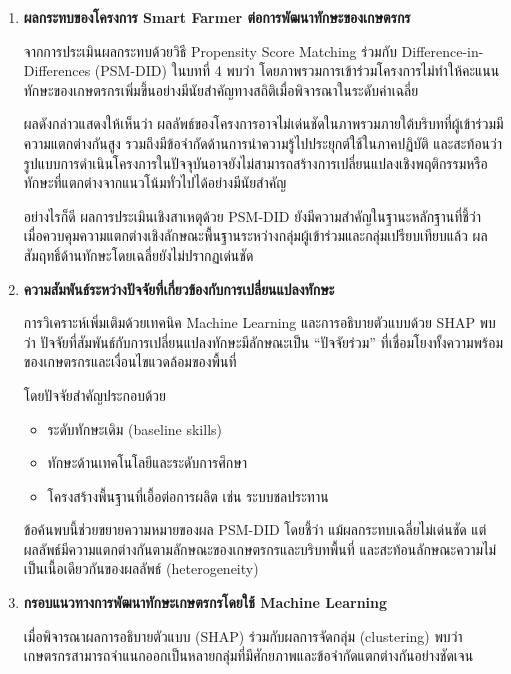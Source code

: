 \begin{enumerate}

\item \textbf{ผลกระทบของโครงการ Smart Farmer ต่อการพัฒนาทักษะของเกษตรกร}

จากการประเมินผลกระทบด้วยวิธี Propensity Score Matching ร่วมกับ Difference-in-Differences (PSM-DID) ในบทที่ 4 พบว่า โดยภาพรวมการเข้าร่วมโครงการไม่ทำให้คะแนนทักษะของเกษตรกรเพิ่มขึ้นอย่างมีนัยสำคัญทางสถิติเมื่อพิจารณาในระดับค่าเฉลี่ย

ผลดังกล่าวแสดงให้เห็นว่า ผลลัพธ์ของโครงการอาจไม่เด่นชัดในภาพรวมภายใต้บริบทที่ผู้เข้าร่วมมีความแตกต่างกันสูง รวมถึงมีข้อจำกัดด้านการนำความรู้ไปประยุกต์ใช้ในภาคปฏิบัติ และสะท้อนว่า รูปแบบการดำเนินโครงการในปัจจุบันอาจยังไม่สามารถสร้างการเปลี่ยนแปลงเชิงพฤติกรรมหรือทักษะที่แตกต่างจากแนวโน้มทั่วไปได้อย่างมีนัยสำคัญ

อย่างไรก็ดี ผลการประเมินเชิงสาเหตุด้วย PSM-DID ยังมีความสำคัญในฐานะหลักฐานที่ชี้ว่า เมื่อควบคุมความแตกต่างเชิงลักษณะพื้นฐานระหว่างกลุ่มผู้เข้าร่วมและกลุ่มเปรียบเทียบแล้ว ผลสัมฤทธิ์ด้านทักษะโดยเฉลี่ยยังไม่ปรากฏเด่นชัด

\item \textbf{ความสัมพันธ์ระหว่างปัจจัยที่เกี่ยวข้องกับการเปลี่ยนแปลงทักษะ}

การวิเคราะห์เพิ่มเติมด้วยเทคนิค Machine Learning และการอธิบายตัวแบบด้วย SHAP พบว่า ปัจจัยที่สัมพันธ์กับการเปลี่ยนแปลงทักษะมีลักษณะเป็น “ปัจจัยร่วม” ที่เชื่อมโยงทั้งความพร้อมของเกษตรกรและเงื่อนไขแวดล้อมของพื้นที่

โดยปัจจัยสำคัญประกอบด้วย

\begin{itemize}
\item ระดับทักษะเดิม (baseline skills)
\item ทักษะด้านเทคโนโลยีและระดับการศึกษา
\item โครงสร้างพื้นฐานที่เอื้อต่อการผลิต เช่น ระบบชลประทาน
\end{itemize}

ข้อค้นพบนี้ช่วยขยายความหมายของผล PSM-DID โดยชี้ว่า แม้ผลกระทบเฉลี่ยไม่เด่นชัด แต่ผลลัพธ์มีความแตกต่างกันตามลักษณะของเกษตรกรและบริบทพื้นที่ และสะท้อนลักษณะความไม่เป็นเนื้อเดียวกันของผลลัพธ์ (heterogeneity)

\item \textbf{กรอบแนวทางการพัฒนาทักษะเกษตรกรโดยใช้ Machine Learning}

เมื่อพิจารณาผลการอธิบายตัวแบบ (SHAP) ร่วมกับผลการจัดกลุ่ม (clustering) พบว่า เกษตรกรสามารถจำแนกออกเป็นหลายกลุ่มที่มีศักยภาพและข้อจำกัดแตกต่างกันอย่างชัดเจน


\end{enumerate}

